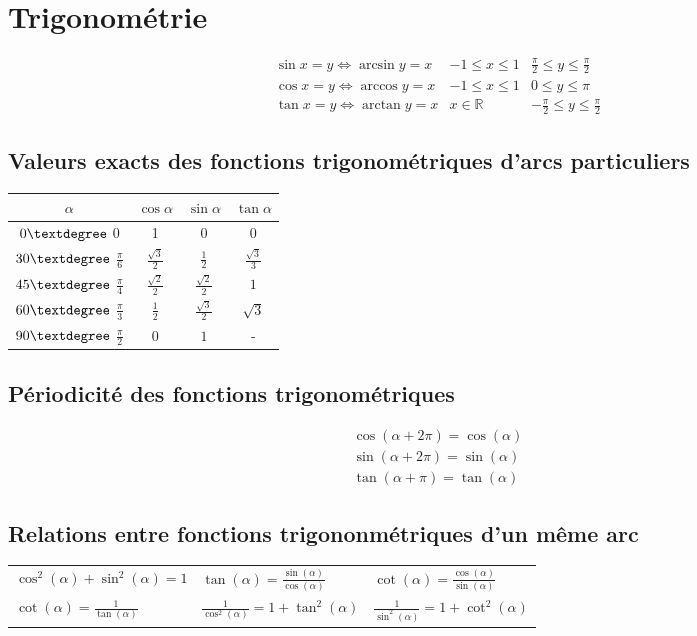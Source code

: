 \chapter{Trigonométrie}
\begin{eqnarray}
	\sin x = y \Leftrightarrow \arcsin y=x & -1\leq x\leq 1 & \frac{\pi}{2}\leq y\leq\frac{\pi}{2}\\
	\cos x = y \Leftrightarrow \arccos y=x & -1\leq x\leq 1 & 0\leq y\leq\pi\\
	\tan x = y \Leftrightarrow \arctan y=x &x\in\mathbb R&-\frac{\pi}{2}\leq y\leq \frac{\pi}{2}
\end{eqnarray}
\section{Valeurs exacts des fonctions trigonométriques d'arcs particuliers}
\begin{tabular}{| c|c|c|c|}
    \hline
	$\alpha$ & $\cos\alpha$ & $\sin\alpha$ & $\tan\alpha$\\
    \hline
    $0\textdegree$  0 & 1 & 0 & 0\\
    \hline
	$30\textdegree$ $\frac{\pi}{6}$ & $\frac{\sqrt{3}}{2}$ & $\frac{1}{2}$ & $\frac{\sqrt 3}{3}$\\
	\hline
	$45\textdegree$ $\frac{\pi}{4}$ & $\frac{\sqrt{2}}{2}$ & $\frac{\sqrt 2}{2}$ & $1$\\
	\hline
	$60\textdegree$ $\frac{\pi}{3}$  & $\frac{1}{2}$ & $\frac{\sqrt{3}}{2}$ & $\sqrt 3$\\
	\hline
	$90\textdegree$ $\frac{\pi}{2}$  & $0$ & $1$ & -\\
	\hline
 \end{tabular}
\section{Périodicité des fonctions trigonométriques}
\begin{eqnarray}
	\cos{(\alpha+2\pi)}=\cos{(\alpha)}\\
	\sin{(\alpha+2\pi)}=\sin{(\alpha)}\\
	\tan{(\alpha+\pi)}=\tan{(\alpha)}
\end{eqnarray}
\section{Relations entre fonctions trigononmétriques d'un même arc}
\begin{tabular}{|l|l|l|}
    \hline
	$\cos^2{(\alpha)}+\sin^2{(\alpha)}=1$ &
	$\tan{(\alpha)}=\frac{\sin{(\alpha)}}{\cos{(\alpha)}}$ &
	$\cot{(\alpha)}=\frac{\cos{(\alpha)}}{\sin{(\alpha)}}$ \\
	$\cot{(\alpha)}=\frac{1}{\tan{(\alpha)}}$ &
	$\frac{1}{\cos^2{(\alpha)}}=1+\tan^2{(\alpha)}$ &
	$\frac{1}{\sin^2{(\alpha)}}=1+\cot^2{(\alpha)}$  \\
	\hline
\end{tabular}
